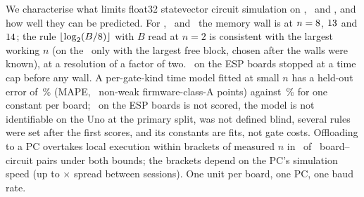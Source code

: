 We characterise what limits float32 statevector circuit simulation on \uno, \espA\ and \espB, and how well they can be predicted. For \hall, \bell\ and \qft\ the memory wall is at $n=8$, $13$ and $14$; the rule $\lfloor\log_2(B/8)\rfloor$ with $B$ read at $n=2$ is consistent with the largest working $n$ (on the \espB\ only with the largest free block, chosen after the walls were known), at a resolution of a factor of two. \grover\ on the ESP boards stopped at a time cap before any wall. A per-gate-kind time model fitted at small $n$ has a held-out error of \MapeTwoClean\,\% (MAPE, \NCleanTwo\ non-weak firmware-class-A points) against \MapeOneClean\,\% for one constant per board; \grover\ on the ESP boards is not scored, the model is not identifiable on the Uno at the primary split, was not defined blind, several rules were set after the first scores, and its constants are fits, not gate costs. Offloading to a PC overtakes local execution within brackets of measured $n$ in \CrossBoth\ of \NCross\ board--circuit pairs under both bounds; the brackets depend on the PC's simulation speed (up to \SimSpreadMax$\times$ spread between sessions). One unit per board, one PC, one baud rate.
